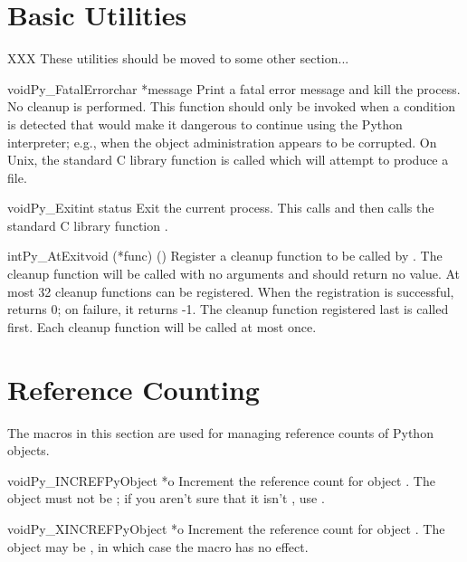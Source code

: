 \documentclass[twoside]{report}
\begin{document}
\chapter{Basic Utilities}

XXX These utilities should be moved to some other section...

\begin{cfuncdesc}{void}{Py_FatalError}{char *message}
Print a fatal error message and kill the process.  No cleanup is
performed.  This function should only be invoked when a condition is
detected that would make it dangerous to continue using the Python
interpreter; e.g., when the object administration appears to be
corrupted.  On Unix, the standard C library function  is 
called which will attempt to produce a  file.
\end{cfuncdesc}

\begin{cfuncdesc}{void}{Py_Exit}{int status}
Exit the current process.  This calls  and then
calls the standard C library function .
\end{cfuncdesc}

\begin{cfuncdesc}{int}{Py_AtExit}{void (*func) ()}
Register a cleanup function to be called by .  The
cleanup function will be called with no arguments and should return no
value.  At most 32 cleanup functions can be registered.  When the
registration is successful,  returns 0; on failure, it
returns -1.  The cleanup function registered last is called first.
Each cleanup function will be called at most once.
\end{cfuncdesc}


\chapter{Reference Counting}

The macros in this section are used for managing reference counts
of Python objects.

\begin{cfuncdesc}{void}{Py_INCREF}{PyObject *o}
Increment the reference count for object .  The object must
not be \NULL{}; if you aren't sure that it isn't \NULL{}, use
.
\end{cfuncdesc}

\begin{cfuncdesc}{void}{Py_XINCREF}{PyObject *o}
Increment the reference count for object .  The object may be
\NULL{}, in which case the macro has no effect.
\end{cfuncdesc}
\end{document}
